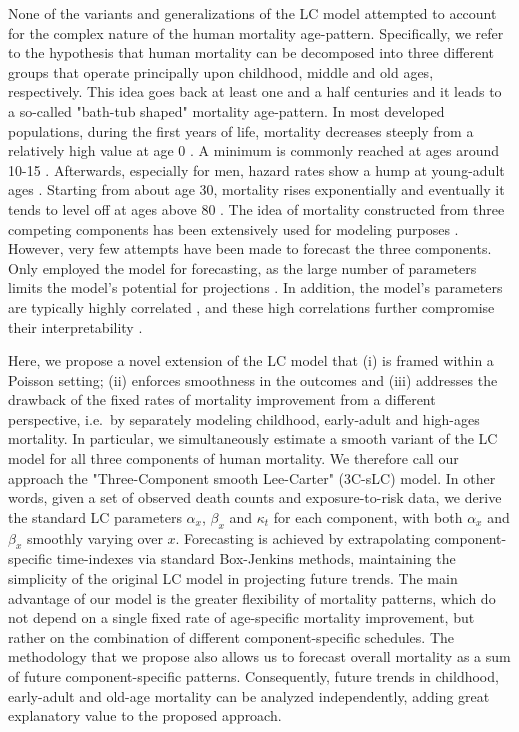 \documentclass[Thesis]{subfiles}
\begin{document}
None of the variants and generalizations of the LC model attempted to account for the complex nature of the human mortality age-pattern. Specifically, we refer to the hypothesis that human mortality can be decomposed into three different groups that operate principally upon childhood, middle and old ages, respectively. This idea goes back at least one and a half centuries \citep{thiele1871mathematical} and it leads to a so-called "bath-tub shaped" mortality age-pattern. In most developed populations, during the first years of life, mortality decreases steeply from a relatively high value at age 0 \citep{levitis2011before}. A minimum is commonly reached at ages around 10-15 \citep{ebeling2018how}. Afterwards, especially for men, hazard rates show a hump at young-adult ages \citep{goldstein2011secular, remund2015jeunesses}. Starting from about age 30, mortality rises exponentially and eventually it tends to level off at ages above 80 \citep{PrestonMortPattern1976, vaupel1997trajectories, thatcher1998force}. The idea of mortality constructed from three competing components has been extensively used for modeling purposes \citep{siler1979competing,siler1983parameters,heligman1980age, kostaki1992nine, rogers1994parameterizing,dellaportas2001bayesian, de2016new, camarda2016sums, mazzuco2018mortality, remund2018young}. However, very few attempts have been made to forecast the three components. Only \cite{forfar1987changing} employed the \citeauthor{heligman1980age} model for forecasting, as the large number of parameters limits the model's potential for projections \citep{mcnown1992forecasting}. In addition, the model's parameters are typically highly correlated \citep{hartmann1987past}, and these high correlations further compromise their interpretability \citep{booth2008mortality}.

Here, we propose a novel extension of the LC model that (i) is framed within a Poisson setting; (ii) enforces smoothness in the outcomes and (iii) addresses the drawback of the fixed rates of mortality improvement from a different perspective, i.e.~by separately modeling childhood, early-adult and high-ages mortality. In particular, we simultaneously estimate a smooth variant of the LC model for all three components of human mortality. We therefore call our approach the "Three-Component smooth Lee-Carter" (3C-sLC) model. In other words, given a set of observed death counts and exposure-to-risk data, we derive the standard LC parameters $\alpha_x$, $\beta_x$ and $\kappa_t$ for each component, with both $\alpha_x$ and $\beta_x$ smoothly varying over $x$. Forecasting is achieved by extrapolating component-specific time-indexes via standard Box-Jenkins methods, maintaining the simplicity of the original LC model in projecting future trends.  The main advantage of our model is the greater flexibility of mortality patterns, which do not depend on a single fixed rate of age-specific mortality improvement, but rather on the combination of different component-specific schedules.  The methodology that we propose also allows us to forecast overall mortality as a sum of future component-specific patterns. Consequently, future trends in childhood, early-adult and old-age mortality can be analyzed independently, adding great explanatory value to the proposed approach. 
\end{document}
